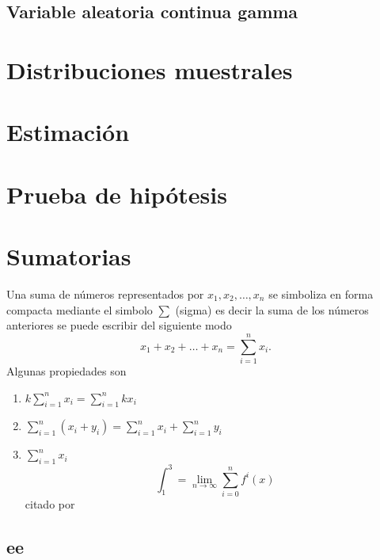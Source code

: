 \documentclass[10pt,]{krantz}
\providecommand{\tightlist}{%
  \setlength{\itemsep}{0pt}\setlength{\parskip}{0pt}}
\theoremstyle{definition}
\theoremstyle{definition}
\theoremstyle{definition}
\theoremstyle{remark}
\begin{document}
\hypertarget{variable-aleatoria-continua-gamma}{%
\section{Variable aleatoria continua gamma}\label{variable-aleatoria-continua-gamma}}

\hypertarget{distribuciones-muestrales}{%
\chapter{Distribuciones muestrales}\label{distribuciones-muestrales}}

\hypertarget{estimaciuxf3n}{%
\chapter{Estimación}\label{estimaciuxf3n}}

\hypertarget{prueba-de-hipuxf3tesis}{%
\chapter{Prueba de hipótesis}\label{prueba-de-hipuxf3tesis}}

\hypertarget{appendix-apendice}{%
\appendix {}}


\hypertarget{sumatorias}{%
\chapter{Sumatorias}\label{sumatorias}}

Una suma de números representados por \(x_1, x_2, \ldots, x_n\) se simboliza en forma compacta mediante el simbolo \(\sum\) (sigma) es decir la suma de los números anteriores se puede escribir del siguiente modo \[x_1+x_2+\dots+x_n=\sum_{i=1}^nx_i.\]
Algunas propiedades son

\begin{enumerate}
\def\labelenumi{\arabic{enumi}.}
\tightlist
\item
  \(k\sum_{i=1}^nx_i=\sum_{i=1}^nkx_i\)
\item
  \(\sum_{i=1}^n\left(x_i+y_i\right)=\sum_{i=1}^nx_i+\sum_{i=1}^ny_i\)
\item
  \(\sum_{i=1}^nx_i\)
  \[\int_1^3=\lim_{n\to \infty}\sum_{i=0}^{n}f^i(x)\]
  citado por \citep{xie2015}
\end{enumerate}

\hypertarget{ee}{%
\section{ee}\label{ee}}
\end{document}
